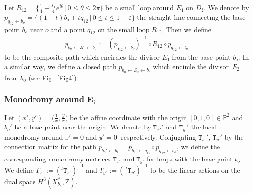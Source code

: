 \documentclass[10pt,a4paper]{amsart}
\numberwithin{equation}{section}
\begin{document}
\begin{Definition} Let $R_{12}=\big\{ \frac{1}{4}+\frac{s_{1}}{4}e^{i\theta}\,|\,0\leq\theta\leq2\pi\big\} $ be a small loop around $E_{1}$ on $D_{2}$. We denote by $p_{q_{12}\leftarrow b_{o}}= \{ (1-t)b_{o}+tq_{12}\,|\,0\leq t\leq1-\varepsilon \} $ the straight line connecting the base point $b_{o}$ near $o$ and a point $q_{12}$ on the small loop $R_{12}$. Then we define
\begin{gather*}
p_{b_{o}\leftarrow E_{1}\leftarrow b_{0}}:=(p_{q_{12}\leftarrow b_{o}})^{-1}\circ R_{12}\circ p_{q_{12}\leftarrow b_{o}}
\end{gather*}
to be the composite path which encircles the divisor $E_{1}$ from the base point $b_{o}$. In a similar way, we define a closed path $p_{b_{0}\leftarrow E_{2}\leftarrow b_{o}}$ which encircle the divisor~$E_{2}$ from $b_{0}$ (see Fig.~\ref{Fig4}).

\subsubsection[Monodromy around $E_i$]{Monodromy around $\boldsymbol{E_i}$} \label{para:monod-Ei-p3p3}

Let $(x',y')=\big(\frac{1}{x},\frac{y}{x}\big)$ be the affine coordinate with the origin $[0,1,0]\in\mathbb{P}^{2}$ and $b_{o}'$ be a base point near the origin. We denote by $\mathtt{T}_{x'}'$ and $\mathtt{T}_{y'}'$ the local monodromy around $x'=0$ and $y'=0$, respectively. Conjugating $\mathtt{T}_{x'}'$, $\mathtt{T}_{y'}'$ by the connection matrix for the path $p_{b_{o}'\leftarrow b_{0}}=p_{b_{0}'\leftarrow q_{12}}\circ p_{q_{12}\leftarrow b_{o}}$, we define the corresponding monodromy matrices $\mathtt{T}_{x'}$ and $\mathtt{T}_{y'}$ for loops with the base point $b_{o}$. We define $T_{x'}:=(^{t}\mathtt{T}_{x'})^{-1}$ and $T_{y'}:=(\,^{t}\mathtt{T}_{y'})^{-1}$ to be the linear actions on the dual space $H^{3}(X_{b_{o}}^{*},\mathbb{Z})$. \end{Definition}
\end{document}

